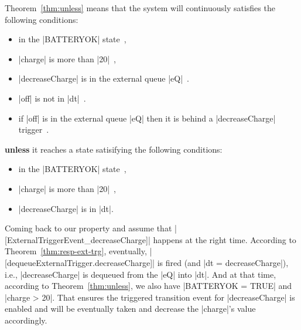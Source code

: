 Theorem~\ref{thm:unless} means that the system will continuously
satisfies the following conditions:
\begin{itemize}
\item in the |BATTERYOK| state~,
  
\item |charge| is more than |20|~,
  
\item |decreaseCharge| is in the external queue |eQ|~.
  
\item |off| is not in |dt|~.
  
\item if |off| is in the external queue |eQ| then it is behind a
  |decreaseCharge| trigger~.
\end{itemize}
\textbf{unless} it reaches a state satisifying the following conditions:
\begin{itemize}
\item in the |BATTERYOK| state~,
  
\item |charge| is more than |20|~,
  
\item |decreaseCharge| is in |dt|.
\end{itemize}

Coming back to our property and assume that
|[ExternalTriggerEvent_decreaseCharge]| happens at the right time.
According to Theorem~\ref{thm:resp-ext-trg}, eventually,
|[dequeueExternalTrigger.decreaseCharge]| is fired (and %
|dt = {decreaseCharge}|), %
i.e., |decreaseCharge| is dequeued from the |eQ| into |dt|. And at
that time, according to Theorem~\ref{thm:unless}, we also have
|BATTERYOK = TRUE| and |charge > 20|.  That ensures the triggered
transition event for |decreaseCharge| is enabled and will be
eventually taken and decrease the |charge|'s value accordingly.




